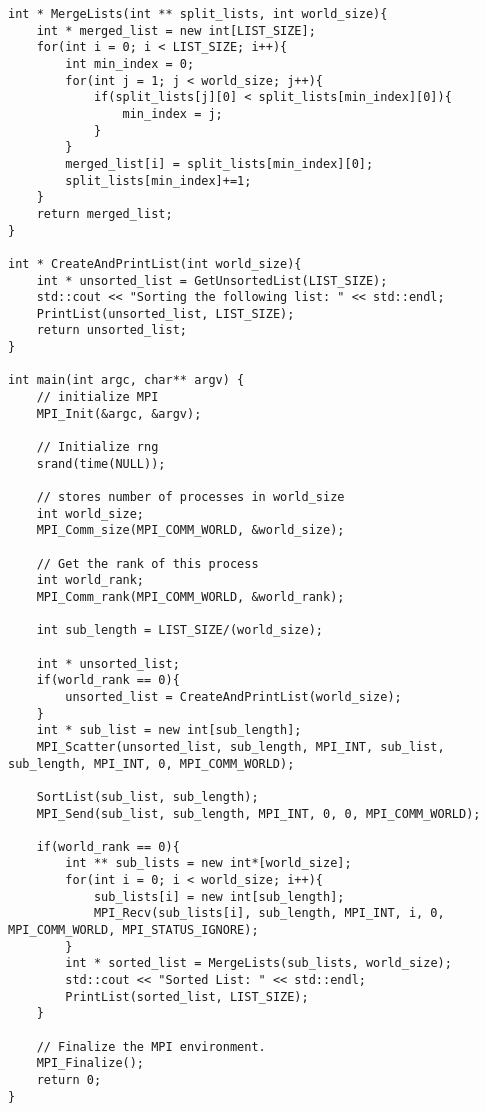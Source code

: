 \documentclass[12pt]{article}
\begin{document}
\begin{verbatim}
int * MergeLists(int ** split_lists, int world_size){
	int * merged_list = new int[LIST_SIZE];
	for(int i = 0; i < LIST_SIZE; i++){
		int min_index = 0;
		for(int j = 1; j < world_size; j++){
			if(split_lists[j][0] < split_lists[min_index][0]){
				min_index = j;
			}
		}
		merged_list[i] = split_lists[min_index][0];
		split_lists[min_index]+=1;
	}
	return merged_list;
}

int * CreateAndPrintList(int world_size){
	int * unsorted_list = GetUnsortedList(LIST_SIZE);
	std::cout << "Sorting the following list: " << std::endl;
	PrintList(unsorted_list, LIST_SIZE);
	return unsorted_list;
}

int main(int argc, char** argv) {
	// initialize MPI
	MPI_Init(&argc, &argv);

	// Initialize rng
	srand(time(NULL));

	// stores number of processes in world_size
	int world_size;
	MPI_Comm_size(MPI_COMM_WORLD, &world_size);

	// Get the rank of this process
	int world_rank;
	MPI_Comm_rank(MPI_COMM_WORLD, &world_rank);

	int sub_length = LIST_SIZE/(world_size);

	int * unsorted_list;
	if(world_rank == 0){
		unsorted_list = CreateAndPrintList(world_size);
	}
	int * sub_list = new int[sub_length];
	MPI_Scatter(unsorted_list, sub_length, MPI_INT, sub_list, sub_length, MPI_INT, 0, MPI_COMM_WORLD);

	SortList(sub_list, sub_length);
	MPI_Send(sub_list, sub_length, MPI_INT, 0, 0, MPI_COMM_WORLD);

	if(world_rank == 0){
		int ** sub_lists = new int*[world_size];
		for(int i = 0; i < world_size; i++){
			sub_lists[i] = new int[sub_length];
			MPI_Recv(sub_lists[i], sub_length, MPI_INT, i, 0, MPI_COMM_WORLD, MPI_STATUS_IGNORE);
		}
		int * sorted_list = MergeLists(sub_lists, world_size);
		std::cout << "Sorted List: " << std::endl;
		PrintList(sorted_list, LIST_SIZE);
	}

	// Finalize the MPI environment.
	MPI_Finalize();
	return 0;
}
\end{verbatim}
\end{document}
